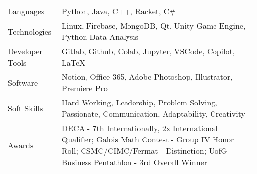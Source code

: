 \documentclass[letterpaper,11pt]{article}
\begin{document}
\begin{tabularx}{\linewidth}{@{}l@{\hspace{0.5em}}X@{}}
Languages &  \normalsize{Python, Java, C++, Racket, C\#}\\
Technologies  &  \normalsize{Linux,  Firebase, MongoDB, Qt, Unity Game Engine, Python Data Analysis}\\ 
Developer Tools &  \normalsize{Gitlab,  Github, Colab, Jupyter, VSCode, Copilot, LaTeX}\\
Software  &  \normalsize{Notion, Office 365, Adobe Photoshop, Illustrator, Premiere Pro}\\ 
Soft Skills &  \normalsize{Hard Working, Leadership, Problem Solving, Passionate, Communication, Adaptability, Creativity}\\
Awards & \normalsize{DECA - 7th Internationally, 2x International Qualifier; Galois Math Contest - Group IV Honor Roll; CSMC/CIMC/Fermat - Distinction; UofG Business Pentathlon - 3rd Overall Winner}\\
\end{tabularx}

\vfill
{}
\end{document}
